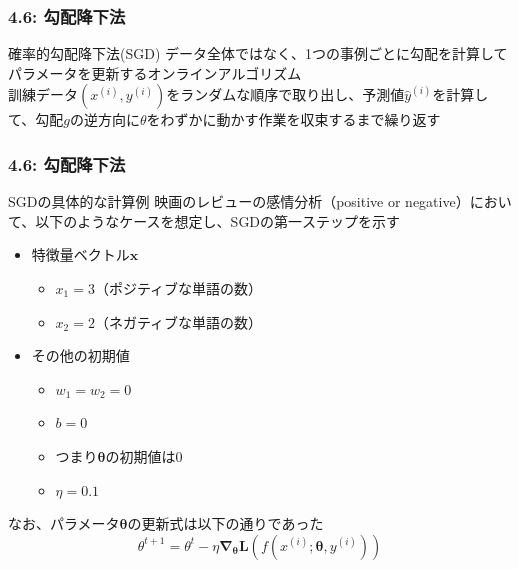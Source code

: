 \documentclass[unicode,11pt]{beamer} %
\begin{document}
\begin{frame}
    \frametitle{4.6: 勾配降下法}
    \begin{alertblock}{確率的勾配降下法(SGD)}
        データ全体ではなく、1つの事例ごとに勾配を計算してパラメータを更新するオンラインアルゴリズム
        \\訓練データ$(x^{(i)}, y^{(i)})$をランダムな順序で取り出し、予測値$\hat{y}^{(i)}$を計算して、勾配$g$の逆方向に$\theta$をわずかに動かす作業を収束するまで繰り返す
    \end{alertblock}
\end{frame}

\begin{frame}
    \frametitle{4.6: 勾配降下法}
    \begin{exampleblock}{SGDの具体的な計算例}
        映画のレビューの感情分析（positive or negative）において、以下のようなケースを想定し、SGDの第一ステップを示す
        \begin{itemize}
            \item 特徴量ベクトル$\boldsymbol{x}$
            \begin{itemize}
                \item $x_1 = 3$（ポジティブな単語の数）
                \item $x_2 = 2$（ネガティブな単語の数）
            \end{itemize}
            \item その他の初期値
            \begin{itemize}
                \item $w_1 = w_2 = 0$
                \item $b = 0$
                \item つまり$\boldsymbol{\theta}$の初期値は0
                \item $\eta = 0.1$
            \end{itemize}
        \end{itemize}
        なお、パラメータ$\boldsymbol{\theta}$の更新式は以下の通りであった
        \begin{equation*}
            \theta^{t+1} = \theta^t - \eta \boldsymbol{\nabla_{\theta} L}(f(x^{(i)};\boldsymbol{\theta}, y^{(i)}))
        \end{equation*}
    \end{exampleblock}
\end{frame}
\end{document}
